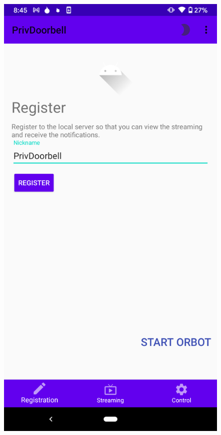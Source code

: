 \begin{figure}
	\begin{minipage}[t]{0.3\linewidth}
		\includegraphics[width=\linewidth]{app_sc_main.png}
	\end{minipage}
	\begin{minipage}[t]{0.3\linewidth}

\end{minipage}
\end{figure}
